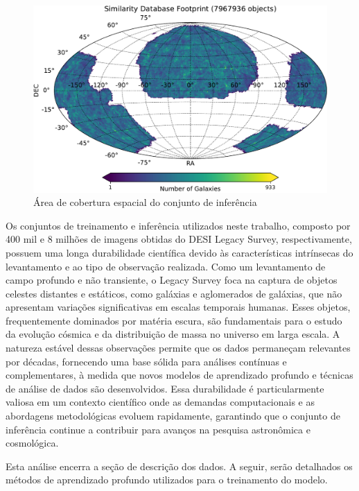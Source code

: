 \begin{figure}[!ht]
  \centering
  \includegraphics[width=\linewidth]{figures/similarity_footprint.pdf}
  \caption{Área de cobertura espacial do conjunto de inferência}
  \label{fig:conjuntos_inferencia}
\end{figure}


Os conjuntos de treinamento e inferência utilizados neste trabalho, composto por 400 mil e 8 milhões de imagens obtidas do DESI Legacy Survey, respectivamente, possuem uma longa durabilidade científica devido às características intrínsecas do levantamento e ao tipo de observação realizada. Como um levantamento de campo profundo e não transiente, o Legacy Survey foca na captura de objetos celestes distantes e estáticos, como galáxias e aglomerados de galáxias, que não apresentam variações significativas em escalas temporais humanas. Esses objetos, frequentemente dominados por matéria escura, são fundamentais para o estudo da evolução cósmica e da distribuição de massa no universo em larga escala. A natureza estável dessas observações permite que os dados permaneçam relevantes por décadas, fornecendo uma base sólida para análises contínuas e complementares, à medida que novos modelos de aprendizado profundo e técnicas de análise de dados são desenvolvidos. Essa durabilidade é particularmente valiosa em um contexto científico onde as demandas computacionais e as abordagens metodológicas evoluem rapidamente, garantindo que o conjunto de inferência continue a contribuir para avanços na pesquisa astronômica e cosmológica.

Esta análise encerra a seção de descrição dos dados. A seguir, serão detalhados os métodos de aprendizado profundo utilizados para o treinamento do modelo.







